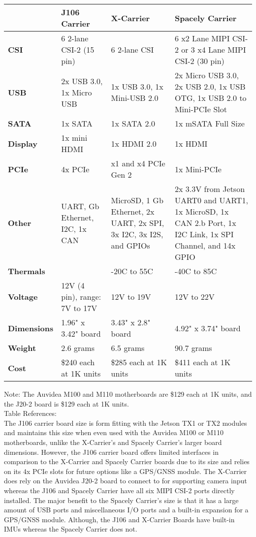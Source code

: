 \documentclass[letterpaper,10pt,serif,draftclsnofoot,onecolumn,compsoc,titlepage]{IEEEtran}
\begin{document}
\begin{tabular}{|l|p{5cm}|p{5cm}|p{5cm}|}
	\hline
	\textbf{} & \textbf{J106 Carrier} & \textbf{X-Carrier} & \textbf{Spacely Carrier}\\
	\hline
	\textbf{CSI} & 6 2-lane CSI-2 (15 pin) & 6 2-lane CSI & 6 x2 Lane MIPI CSI-2 or 3 x4 Lane MIPI CSI-2 (30 pin)\\
	\hline
	\textbf{USB} & 2x USB 3.0, 1x Micro USB & 1x USB 3.0, 1x Mini-USB 2.0 & 2x Micro USB 3.0, 2x USB 2.0, 1x USB OTG, 1x USB 2.0 to Mini-PCIe Slot \\
	\hline
	\textbf{SATA} & 1x SATA & 1x SATA 2.0 & 1x mSATA Full Size \\
	\hline
	\textbf{Display} & 1x mini HDMI & 1x HDMI 2.0 & 1x HDMI \\
	\hline
	\textbf{PCIe} & 4x PCIe & x1 and x4 PCIe Gen 2 & 1x Mini-PCIe \\
	\hline
	\textbf{Other} & UART, Gb Ethernet, I2C, 1x CAN & MicroSD, 1 Gb Ethernet, 2x UART, 2x SPI, 3x I2C, 3x I2S, and GPIOs & 2x 3.3V from Jetson UART0 and UART1, 1x MicroSD, 1x CAN 2.b Port, 1x I2C Link, 1x SPI Channel, and 14x GPIO \\
	\hline
	\textbf{Thermals} &  & -20\degree C to 55\degree C & -40\degree C to 85\degree C \\
	\hline
	\textbf{Voltage} & 12V (4 pin), range: 7V to 17V & 12V to 19V & 12V to 22V \\
	\hline
	\textbf{Dimensions} & 1.96" x 3.42" board & 3.43" x 2.8" board & 4.92" x 3.74" board \\
	\hline
	\textbf{Weight} & 2.6 grams & 6.5 grams & 90.7 grams \\
	\hline
	\textbf{Cost} & \$240 each at 1K units & \$285 each at 1K units & \$411 each at 1K units \\
	\hline
\end{tabular}	
\newline
\newline
\newline
Note: The Auvidea M100 and M110 motherboards are \$129 each at 1K units, and the 
J20-2 board is \$129 each at 1K units. \\
Table References: \cite{AuvideaJ106, MouserJ106, CEIX, CEIXpdf, SpacelyUG, SpacelyQuote, CEIQuote, AuvideaQuote}\\

The J106 carrier board size is form fitting with the Jetson TX1 or TX2 modules and 
maintains this size when even used with the Auvidea M100 or M110 motherboards, unlike 
the X-Carrier's and Spacely Carrier's larger board dimensions. However, the J106 carrier board 
offers limited interfaces in comparison to the X-Carrier and Spacely Carrier boards due 
to its size and relies on its 4x PCIe slots for future options like a GPS/GNSS module. The 
X-Carrier does rely on the Auvidea J20-2 board to connect to for supporting  
camera input whereas the J106 and Spacely Carrier have all six MIPI CSI-2 ports directly 
installed. The major benefit to the Spacely Carrier's size is that it has a large 
amount of USB ports and miscellaneous I/O ports and a built-in expansion for a 
GPS/GNSS module. Although, the J106 and X-Carrier Boards have built-in IMUs whereas the 
Spacely Carrier does not.\\
\end{document}

